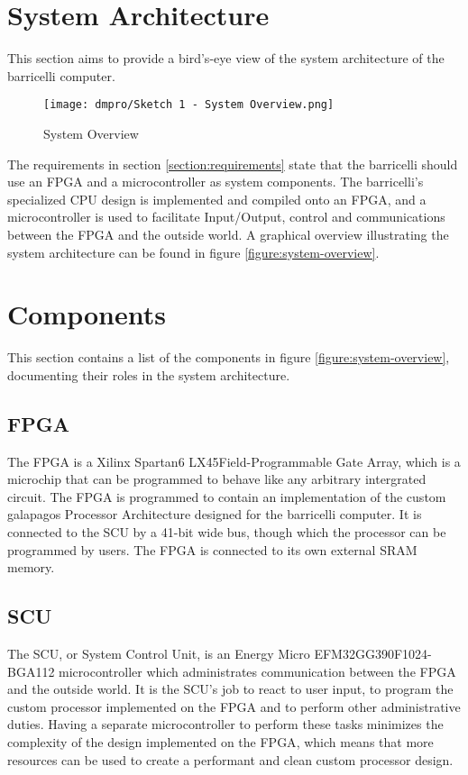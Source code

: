 \section{System Architecture}

This section aims to provide a bird's-eye view of the system architecture of the \Gls{barricelli} computer.

\begin{figure}[H]
\texttt{[image: dmpro/Sketch 1 - System Overview.png]}
\caption{System Overview}
\label{figure:system-overview}
\end{figure}

The requirements in section \vref{section:requirements} state that the \Gls{barricelli} should use an \gls{FPGA} and a microcontroller as system components.
The \Gls{barricelli}'s specialized CPU design is implemented and compiled onto an \gls{FPGA}, and a microcontroller is used to facilitate Input/Output, control and communications between the \gls{FPGA} and the outside world.
A graphical overview illustrating the system architecture can be found in figure \vref{figure:system-overview}.

\section{Components}

This section contains a list of the components in figure \vref{figure:system-overview}, documenting their roles in the system architecture.

\subsection{\gls{FPGA}}

The \gls{FPGA} is a Xilinx Spartan6 LX45\cn Field-Programmable Gate Array, which is a microchip that can be programmed to behave like any arbitrary intergrated circuit.
The \gls{FPGA} is programmed to contain an implementation of the custom \Gls{galapagos} Processor Architecture designed for the \Gls{barricelli} computer.
It is connected to the \gls{SCU} by a 41-bit wide bus, though which the processor can be programmed by users.
The \gls{FPGA} is connected to its own external \gls{SRAM} memory.

\subsection{\gls{SCU}}

The \gls{SCU}, or System Control Unit, is an Energy Micro EFM32GG390F1024-BGA112 microcontroller which administrates communication between the \gls{FPGA} and the outside world.
It is the \gls{SCU}'s job to react to user input, to program the custom processor implemented on the FPGA and to perform other administrative duties.
Having a separate microcontroller to perform these tasks minimizes the complexity of the design implemented on the \gls{FPGA}, which means that more resources can be used to create a performant and clean custom processor design.

